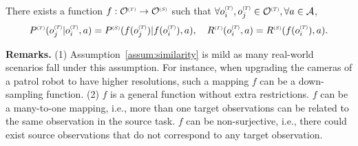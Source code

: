 \begin{assumption}
\label{assum:similarity}
There exists a function $f: \states\target \to \states\source$ such that $\forall o_i\target, o_j\target \in \states\target, \forall a\in\actions$,
\begin{equation*}
    P\target(o_j\target|o_i\target,a) = P\source(f(o_j\target) | f(o_i\target), a), \quad 
    R\target(o_i\target,a) = R\source(f(o_i\target),a).
\end{equation*}
\end{assumption}
\textbf{Remarks.} 
(1) Assumption~\ref{assum:similarity} is mild as many real-world scenarios fall under this assumption. For instance, when upgrading the cameras of a patrol robot to have higher resolutions, such a mapping $f$ can be a down-sampling function.
(2) $f$ is a general function without extra restrictions. $f$ can be a many-to-one mapping, i.e., more than one target observations can be related to the same observation in the source task. $f$ can be non-surjective, i.e., there could exist source observations that do not correspond to any target observation.


